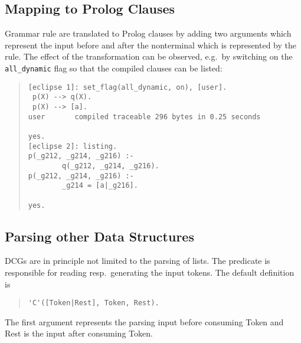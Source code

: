 \subsection{Mapping to Prolog Clauses}
Grammar rule are translated to Prolog clauses by adding two arguments
which represent the input before and after the nonterminal which is
represented by the rule.
The effect of the transformation can be observed, e.g.\ by switching on
the {\tt all_dynamic} flag so that the compiled clauses can be listed:
\begin{quote} \begin{verbatim}
[eclipse 1]: set_flag(all_dynamic, on), [user].
 p(X) --> q(X).
 p(X) --> [a].
user       compiled traceable 296 bytes in 0.25 seconds

yes.
[eclipse 2]: listing.
p(_g212, _g214, _g216) :-
        q(_g212, _g214, _g216).
p(_g212, _g214, _g216) :-
        _g214 = [a|_g216].

yes.
\end{verbatim} \end{quote}

\subsection{Parsing other Data Structures}

DCGs are in principle not limited to the parsing of lists.
The predicate  is responsible for reading resp.\ generating
the input tokens. The default definition is
\begin{quote}\begin{verbatim}
'C'([Token|Rest], Token, Rest).
\end{verbatim}\end{quote}
The first argument represents the parsing input before consuming
Token and Rest is the input after consuming Token.

